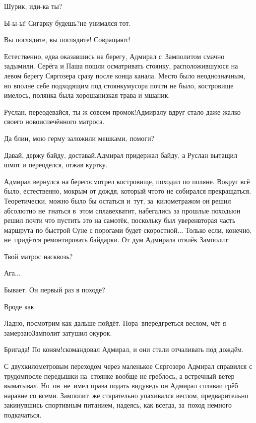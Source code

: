 \diagdash Шурик, иди-ка ты?

\diagdash Ы-ы-ы! Сигарку будешь?\mdash не унимался тот.

\diagdash Вы поглядите, вы поглядите! Совращают!

Естественно, едва оказавшись на берегу, Адмирал с~Замполитом смачно задымили. Серёга и Паша пошли осматривать стоянку, расположившуюся на левом берегу Сяргозера сразу после конца канала. Место было неоднозначным, но вполне себе подходящим под стоянку\mdash мусора почти не было, костровище имелось, полянка была хороша\mdash низкая трава и мшаник.

\diagdash Руслан, переодевайся, ты ж совсем промок!\mdash Адмиралу вдруг стало даже жалко своего новоиспечённого матроса. 

\diagdash Да блин, мою герму заложили мешками, помоги?

\diagdash Давай, держу байду, доставай.\mdash Адмирал придержал байду, а Руслан вытащил шмот и переоделся, отжав куртку. 

Адмирал вернулся на берег\mdash осмотрел костровище, походил по поляне. Вокруг всё было, естественно, мокрым от дождя, который что\sdash то не собирался прекращаться. Теоретически, можно было бы остаться и~тут, за~километражом он решил абсолютно не~гнаться в~этом сплаве\mdash хватит, набегались за прошлые походы\mdash он решил почти что пустить это на самотёк, поскольку был уверен\mdash вторая часть маршрута по быстрой Суне с порогами будет скоростной$\ldots$ Только если, конечно, не~придётся ремонтировать байдарки. От дум Адмирала отвлёк Замполит:

\diagdash Твой матрос насквозь?

\diagdash Ага$\ldots$

\diagdash Бывает. Он первый раз в походе?

\diagdash Вроде как.

\diagdash Ладно, посмотрим как дальше пойдёт. Пора~вперёд\mdash греться веслом, чёт я замерзаю\mdash Замполит затушил окурок.

\diagdash Бригада! По коням!\mdash скомандовал Адмирал, и они стали отчаливать под дождём.

С двухкилометровым переходом через маленькое Сяргозеро Адмирал справился с трудом\mdash после передышки на~стоянке вообще не греблось, а встречный ветер выматывал. Но~он~не~имел права подать виду\mdash ведь он Адмирал сплава\mdash и грёб наравне со всеми. Замполит~же старательно упахивался веслом, предварительно закинувшись спортивным питанием, надеясь, как всегда, за~поход немного подкачаться. 

